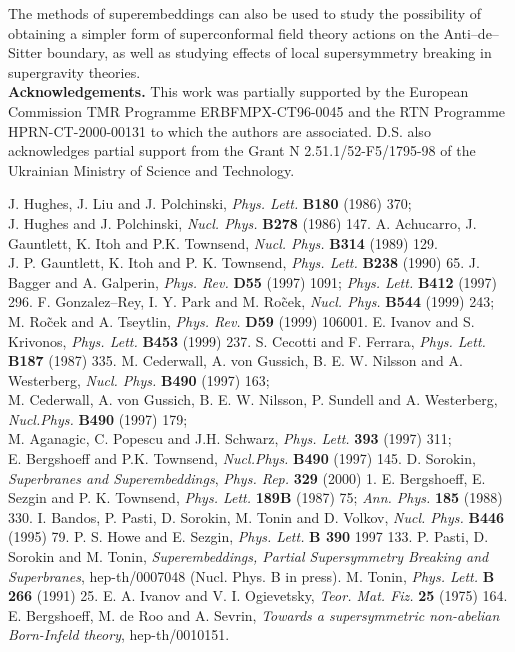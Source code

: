 \documentclass[a4paper,12pt]{article}
\begin{document}
The methods of superembeddings can also be used to study the
possibility of obtaining a simpler form of superconformal field
theory actions on the Anti--de--Sitter boundary, as well as
studying effects of local supersymmetry breaking in supergravity
theories.
\\

\noindent
{\bf Acknowledgements.} This work was partially supported by the
European Commission TMR Programme ERBFMPX-CT96-0045 and the RTN
Programme HPRN-CT-2000-00131 to which the authors are associated.
D.S. also acknowledges partial support from the Grant N
2.51.1/52-F5/1795-98 of the Ukrainian Ministry of Science and
Technology.


\begin{thebibliography}{99}
J. Hughes, J. Liu and J. Polchinski, {\em Phys. Lett.} {\bf B180} (1986) 370;\\
J. Hughes and J. Polchinski, {\em Nucl. Phys.} {\bf B278} (1986)
147.
A. Achucarro, J. Gauntlett, K. Itoh and P.K. Townsend, {\em Nucl.
Phys.} {\bf B314} (1989) 129.\\
J. P. Gauntlett, K. Itoh and P. K. Townsend, {\em Phys. Lett.}
{\bf B238} (1990) 65.
J. Bagger and A. Galperin, {\em Phys. Rev.\/} {\bf D55} (1997)
1091; {\em Phys. Lett.} {\bf B412} (1997) 296.
F. Gonzalez--Rey, I. Y. Park and M. Ro\~cek, {\em Nucl. Phys.}
{\bf B544}
(1999) 243;\\
M. Ro\~cek and A. Tseytlin, {\em Phys. Rev.} {\bf D59} (1999)
106001.
E. Ivanov and S. Krivonos, {\em Phys. Lett.\/} {\bf B453} (1999)
237.
S. Cecotti and F. Ferrara, {\em Phys. Lett.} {\bf B187} (1987)
335.
M. Cederwall, A. von Gussich, B. E. W. Nilsson and A. Westerberg,
{\em Nucl. Phys.} {\bf B490} (1997) 163;\\
M. Cederwall, A. von Gussich, B. E. W. Nilsson, P. Sundell and
A.  Westerberg, {\em Nucl.Phys.} {\bf B490} (1997) 179;\\
M. Aganagic, C. Popescu and J.H. Schwarz, {\em Phys. Lett.} {\bf 393} (1997) 311;\\
E. Bergshoeff and P.K. Townsend, {\em Nucl.Phys.} {\bf B490}
(1997) 145.
D. Sorokin, {\it Superbranes and Superembeddings},  {\em Phys.
Rep.} {\bf 329} (2000) 1.
E. Bergshoeff, E. Sezgin and P. K. Townsend, {\em  Phys. Lett.\/}
{\bf 189B} (1987) 75; {\em Ann. Phys.} {\bf 185} (1988) 330.
I. Bandos, P. Pasti, D. Sorokin, M. Tonin and D. Volkov, {\em
Nucl. Phys.} {\bf B446} (1995) 79.
P. S. Howe and  E. Sezgin, {\em Phys. Lett.} {\bf B 390} 1997 133.
P. Pasti, D. Sorokin and M. Tonin, {\it Superembeddings, Partial
Supersymmetry Breaking and Superbranes}, hep-th/0007048 (Nucl.
Phys. B in press).
M. Tonin, {\em Phys. Lett.\/} {\bf B 266} (1991) 25.
E. A. Ivanov and V. I. Ogievetsky, {\em Teor. Mat. Fiz.\/} {\bf
25} (1975) 164.
 E. Bergshoeff, M. de Roo and A. Sevrin,
 {\it Towards a supersymmetric non-abelian Born-Infeld theory},
 hep-th/0010151.
\end{thebibliography}
\end{document}
